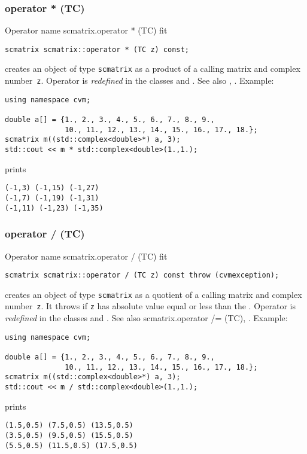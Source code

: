 \subsubsection{operator * (TC)}
Operator%
\pdfdest name {scmatrix.operator * (TC)} fit
\begin{verbatim}
scmatrix scmatrix::operator * (TC z) const;
\end{verbatim}
creates an object of type \verb"scmatrix" as a product of
a calling matrix and  complex number~\verb"z".
Operator is \emph{redefined} in the classes
and .
See also , 
.
Example:
\begin{Verbatim}
using namespace cvm;

double a[] = {1., 2., 3., 4., 5., 6., 7., 8., 9.,
              10., 11., 12., 13., 14., 15., 16., 17., 18.};
scmatrix m((std::complex<double>*) a, 3);
std::cout << m * std::complex<double>(1.,1.);
\end{Verbatim}
prints
\begin{Verbatim}
(-1,3) (-1,15) (-1,27)
(-1,7) (-1,19) (-1,31)
(-1,11) (-1,23) (-1,35)
\end{Verbatim}
\newpage



\subsubsection{operator / (TC)}
Operator%
\pdfdest name {scmatrix.operator / (TC)} fit
\begin{verbatim}
scmatrix scmatrix::operator / (TC z) const throw (cvmexception);
\end{verbatim}
creates an object of type \verb"scmatrix" as a quotient of
a calling matrix and  complex number~\verb"z". 
It throws
if \verb"z" has  absolute value equal or less than the
.
Operator is \emph{redefined} in the classes
and .
See also 
{scmatrix.operator /= (TC)},
.
Example:
\begin{Verbatim}
using namespace cvm;

double a[] = {1., 2., 3., 4., 5., 6., 7., 8., 9.,
              10., 11., 12., 13., 14., 15., 16., 17., 18.};
scmatrix m((std::complex<double>*) a, 3);
std::cout << m / std::complex<double>(1.,1.);
\end{Verbatim}
prints
\begin{Verbatim}
(1.5,0.5) (7.5,0.5) (13.5,0.5)
(3.5,0.5) (9.5,0.5) (15.5,0.5)
(5.5,0.5) (11.5,0.5) (17.5,0.5)
\end{Verbatim}
\newpage



